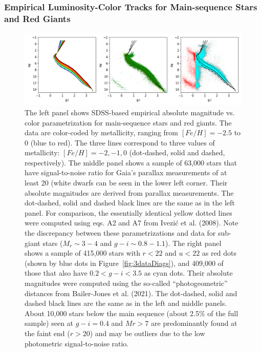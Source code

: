 \subsubsection{Empirical Luminosity-Color Tracks for Main-sequence Stars and Red Giants}

\begin{figure}[b!]
\includegraphics[width=1.0\textwidth,angle=0]{figures/plot3HRdiags.png}  
\caption{The left panel shows SDSS-based empirical absolute magnitude vs. color parametrization for main-sequence stars and red giants.
The data are color-coded by metallicity, ranging from $[Fe/H] = -2.5$ to 0 (blue to red). The three lines correspond to three values of
metallicity: $[Fe/H] = -2, -1, 0$ (dot-dashed, solid and dashed, respectively). The middle panel shows a sample of 63,000 stars that have
signal-to-noise ratio for Gaia’s parallax measurements of at least 20 (white dwarfs can be seen in the lower left corner.
Their absolute magnitudes are derived from parallax measurements. The dot-dashed,
solid and dashed black lines are the same as in the left panel. For comparison, the essentially identical yellow dotted lines were computed
using eqs. A2 and A7 from Ivezi\'{c} et al. (2008).  Note the discrepancy between these parametrizations and data for sub-giant stars ($M_r \sim 3-4$
and $g-i \sim 0.8-1.1$). The right panel shows a sample of 415,000 stars with $r < 22$ and $u<22$ as red dots (shown by blue dots in
Figure~\ref{fig:3dataDiags}), and 409,000 of those that also have  $0.2 < g-i < 3.5$ as cyan dots. Their absolute magnitudes were computed
using the so-called “photogeometric” distances from Bailer-Jones et al. (2021). The dot-dashed, solid and dashed black lines are the
same as in the left and middle panels. About 10,000 stars below the main sequence (about 2.5\% of the full sample) seen at $g-i = 0.4$ and
$Mr > 7$ are predominantly found at the faint end ($r>20$) and may be outliers due to the low photometric signal-to-noise ratio.}
\label{fig:3HRdiags}
\end{figure}


